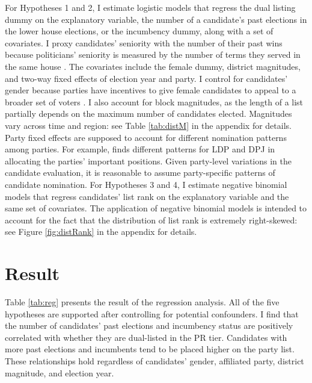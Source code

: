 \documentclass[a4paper, 11pt]{article}
\begin{document}
For Hypotheses 1 and 2, I estimate logistic models that regress the dual listing dummy on the explanatory variable, the number of a candidate's past elections in the lower house elections, or the incumbency dummy, along with a set of covariates. I proxy candidates' seniority with the number of their past wins because politicians' seniority is measured by the number of terms they served in the same house \citep{pekkanen2006electoral}. The covariates include the female dummy, district magnitudes, and two-way fixed effects of election year and party. I control for candidates' gender because parties have incentives to give female candidates to appeal to a broader set of voters \citep{salmond2006proportional, chiru2017value}. I also account for block magnitudes, as the length of a list partially depends on the maximum number of candidates elected. Magnitudes vary across time and region: see Table \ref{tab:distM} in the appendix for details. Party fixed effects are supposed to account for different nomination patterns among parties. For example, \citet{fujimura2012position} finds different patterns for LDP and DPJ in allocating the parties' important positions. Given party-level variations in the candidate evaluation, it is reasonable to assume party-specific patterns of candidate nomination. For Hypotheses 3 and 4, I estimate negative binomial models that regress candidates' list rank on the explanatory variable and the same set of covariates. The application of negative binomial models is intended to account for the fact that the distribution of list rank is extremely right-skewed: see Figure \ref{fig:distRank} in the appendix for details.

\section{Result} \label{sec: res}

Table \ref{tab:reg} presents the result of the regression analysis. All of the five hypotheses are supported after controlling for potential confounders. I find that the number of candidates' past elections and incumbency status are positively correlated with whether they are dual-listed in the PR tier. Candidates with more past elections and incumbents tend to be placed higher on the party list. These relationships hold regardless of candidates' gender, affiliated party, district magnitude, and election year. 


\end{document}

